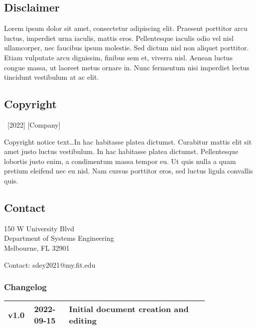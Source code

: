 \thispagestyle{empty} %

\begin{twothirdswidth} %
\footnotesize %

\subsection*{Disclaimer}

Lorem ipsum dolor sit amet, consectetur adipiscing elit. Praesent porttitor arcu luctus, imperdiet urna iaculis, mattis eros. Pellentesque iaculis odio vel nisl ullamcorper, nec faucibus ipsum molestie. Sed dictum nisl non aliquet porttitor. Etiam vulputate arcu dignissim, finibus sem et, viverra nisl. Aenean luctus congue massa, ut laoreet metus ornare in. Nunc fermentum nisi imperdiet lectus tincidunt vestibulum at ac elit.

\subsection*{Copyright}

\textcopyright~[2022] [Company] 

Copyright notice text\ldots In hac habitasse platea dictumst. Curabitur mattis elit sit amet justo luctus vestibulum. In hac habitasse platea dictumst. Pellentesque lobortis justo enim, a condimentum massa tempor eu. Ut quis nulla a quam pretium eleifend nec eu nisl. Nam cursus porttitor eros, sed luctus ligula convallis quis.

\subsection*{Contact}

150 W University Blvd\\
Department of Systems Engineering\\
Melbourne, FL 32901

Contact: sdey2021@my.fit.edu

\subsubsection*{Changelog}

\scriptsize %

\begin{tabular}{@{} L{0.05\linewidth} L{0.15\linewidth} L{0.6\linewidth} @{}} %
	\toprule
	v1.0 & 2022-09-15 & Initial document creation and editing\\
	\bottomrule
\end{tabular}
\end{twothirdswidth}